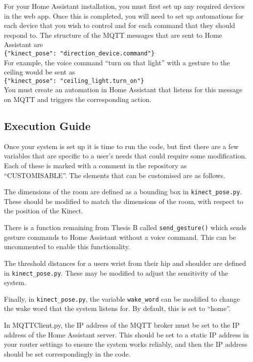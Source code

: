For your Home Assistant installation, you must first set up any required devices in the web app.
Once this is completed, you will need to set up automations for each device that you wish to control and for each command that they should respond to.
The structure of the MQTT messages that are sent to Home Assistant are\\
\texttt{\{"kinect\_pose": "direction\_device.command"\}}\\
For example, the voice command ``turn on that light'' with a gesture to the ceiling would be sent as\\
\texttt{\{"kinect\_pose": "ceiling\_light.turn\_on"\}}\\
You must create an automation in Home Assistant that listens for this message on MQTT and triggers the corresponding action.

\subsection{Execution Guide}
Once your system is set up it is time to run the code, but first there are a few variables that are specific to a user's needs that could require some modification.
Each of these is marked with a comment in the repository as ``CUSTOMISABLE''.
The elements that can be customised are as follows.

The dimensions of the room are defined as a bounding box in \texttt{kinect\_pose.py}.
These should be modified to match the dimensions of the room, with respect to the position of the Kinect.

There is a function remaining from Thesis B called \texttt{send\_gesture()} which sends gesture commands to Home Assistant without a voice command.
This can be uncommented to enable this functionality.

The threshold distances for a users wrist from their hip and shoulder are defined in \texttt{kinect\_pose.py}.
These may be modified to adjust the sensitivity of the system.

Finally, in \texttt{kinect\_pose.py}, the variable \texttt{wake\_word} can be modified to change the wake word that the system listens for.
By default, this is set to ``home''.

In MQTTClient.py, the IP address of the MQTT broker must be set to the IP address of the Home Assistant server.
This should be set to a static IP address in your router settings to ensure the system works reliably, and then the IP address should be set correspondingly in the code.

